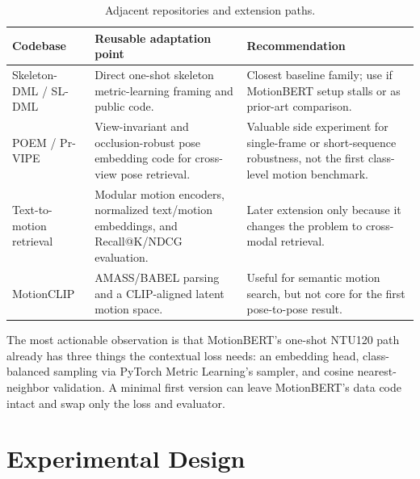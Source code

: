 \documentclass[11pt]{article}
\begin{document}
\begin{table}[htbp]
\small
\centering
\caption{Adjacent repositories and extension paths.}
\label{tab:repos-adjacent}
\begin{tabularx}{\textwidth}{@{}p{2.5cm}Y Y@{}}
\toprule
Codebase & Reusable adaptation point & Recommendation \\
\midrule
Skeleton-DML / SL-DML & Direct one-shot skeleton metric-learning framing and public code. & Closest baseline family; use if MotionBERT setup stalls or as prior-art comparison. \\
POEM / Pr-VIPE & View-invariant and occlusion-robust pose embedding code for cross-view pose retrieval. & Valuable side experiment for single-frame or short-sequence robustness, not the first class-level motion benchmark. \\
Text-to-motion retrieval & Modular motion encoders, normalized text/motion embeddings, and Recall@K/NDCG evaluation. & Later extension only because it changes the problem to cross-modal retrieval. \\
MotionCLIP & AMASS/BABEL parsing and a CLIP-aligned latent motion space. & Useful for semantic motion search, but not core for the first pose-to-pose result. \\
\bottomrule
\end{tabularx}
\end{table}

The most actionable observation is that MotionBERT's one-shot NTU120 path already has three things the contextual loss needs: an embedding head, class-balanced sampling via PyTorch Metric Learning's sampler, and cosine nearest-neighbor validation. A minimal first version can leave MotionBERT's data code intact and swap only the loss and evaluator.

\section{Experimental Design}
\end{document}
